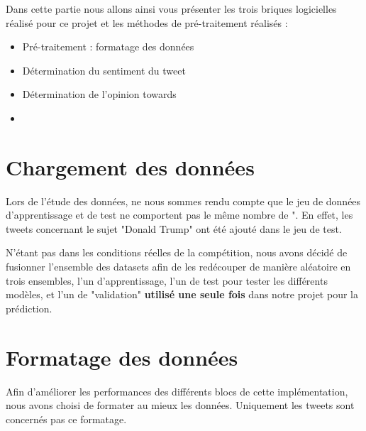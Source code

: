 \par Dans cette partie nous allons ainsi vous présenter les trois briques logicielles réalisé pour ce projet et les méthodes de pré-traitement réalisés :

\begin{itemize}
	\item Pré-traitement : formatage des données
	\item Détermination du sentiment du tweet
	\item Détermination de l'opinion towards
	\item 
\end{itemize}

\section{Chargement des données}

Lors de l'étude des données, ne nous sommes rendu compte que le jeu de données d'apprentissage et de test ne comportent pas le même nombre de ". En effet, les tweets concernant le sujet "Donald Trump" ont été ajouté dans le jeu de test.

N'étant pas dans les conditions réelles de la compétition, nous avons décidé de fusionner l'ensemble des datasets afin de les redécouper de manière aléatoire en trois ensembles, l'un d'apprentissage, l'un de test pour tester les différents modèles, et l'un de "validation" \textbf{utilisé une seule fois} dans notre projet pour la prédiction.


\section{Formatage des données}
\par Afin d'améliorer les performances des différents blocs de cette implémentation, nous avons choisi de formater au mieux les données. Uniquement les tweets sont concernés pas ce formatage.

